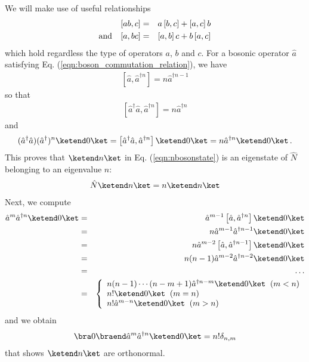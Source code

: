 \begin{enumerate}
We will make use of useful relationships
\begin{eqnarray*}
\left[ab, c\right] &=& a\left[b,c\right] + \left[a, c\right] b
\nonumber\\
\mbox{and}\hspace{3mm}
\left[a, bc\right] &=& \left[ a, b \right] c + b\left[ a,c \right] 
\end{eqnarray*}
which hold regardless the type of operators $a$, $b$ and $c$.
For a bosonic operator $\hat{a}$ satisfying  Eq. (\ref{eqn:boson_commutation_relation}),
we have
\begin{eqnarray*}
\left[ \hat{a}, \hat{a}^{\dagger n} \right]
= n \hat{a}^{\dagger n - 1}
\end{eqnarray*}
so that
\begin{eqnarray}
\left[ \hat{a}^{\dagger} \hat{a}, \hat{a}^{\dagger n} \right]
= n \hat{a}^{\dagger n }
\label{eqn:nbosonnumber}
\end{eqnarray}
and
\begin{eqnarray*}
( \hat{a}^{\dagger} \hat{a} )(\hat{a}^{\dagger})^n \ketend 0 \ket
 =
 \left[ \hat{a}^{\dagger} \hat{a}, \hat{a}^{\dagger n} \right]\ketend 0 \ket
= n \hat{a}^{\dagger n } \ketend 0 \ket\,.
\end{eqnarray*}
This proves that $\ketend n \ket$ in Eq. (\ref{eqn:nbosonstate}) is an eigenstate of $\hat{N}$
belonging to an eigenvalue $n$:
\begin{eqnarray*}
\hat{N} \ketend n \ket = n \ketend n \ket
\end{eqnarray*}
Next, we compute
\begin{eqnarray}
\hat{a}^m \hat{a}^{\dagger n} \ketend 0 \ket
&=&
\hat{a}^{m-1} \left[ \hat{a}, \hat{a}^{\dagger n} \right] \ketend 0 \ket
\nonumber\\
&=&
n \hat{a}^{m-1} \hat{a}^{\dagger n-1} \ketend 0 \ket
\nonumber\\
&=&
n \hat{a}^{m-2} \left[ \hat{a}, \hat{a}^{\dagger n-1} \right] \ketend 0 \ket
\nonumber\\
&=&
n (n-1 )\hat{a}^{m-2} \hat{a}^{\dagger n-2} \ketend 0 \ket
\nonumber\\
&=&
\dots
\nonumber\\
&=&
\left\{
\begin{array}{l}
n (n-1) \cdots (n-m+1) \hat{a}^{\dagger n - m} \ketend 0 \ket \hspace{2mm}(m < n)
\\
n!\ketend 0 \ket \hspace{2mm}(m = n)
\\
n! \hat{a}^{m- n} \ketend 0 \ket \hspace{2mm}(m > n)
\end{array}
\right.
\nonumber
\end{eqnarray}
and we obtain
\begin{eqnarray*}
\bra 0 \braend \hat{a}^m \hat{a}^{\dagger n} \ketend 0 \ket
= 
n!  \delta_{n,m}
\end{eqnarray*}
that shows $\ketend n \ket$ are orthonormal. 
\end{enumerate}




